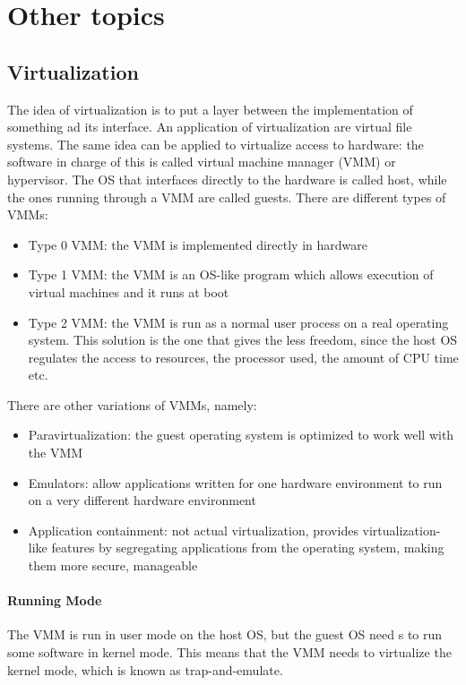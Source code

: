 \chapter{Other topics}
\section{Virtualization}
The idea of virtualization is to put a layer between the implementation of something ad its interface. An application of virtualization are virtual file systems. The same idea can be applied to virtualize access to hardware: the software in charge of this is called virtual machine manager (VMM) or hypervisor. The OS that interfaces directly to the hardware is called host, while the ones running through a VMM are called guests. There are different types of VMMs:
\begin{itemize}
    \item Type 0 VMM: the VMM is implemented directly in hardware
    \item Type 1 VMM: the VMM is an OS-like program which allows execution of virtual machines and it runs at boot
    \item Type 2 VMM: the VMM is run as a normal user process on a real operating system. This solution is the one that gives the less freedom, since the host OS regulates the access to resources, the processor used, the amount of CPU time etc.
\end{itemize}

There are other variations of VMMs, namely:
\begin{itemize}
    \item Paravirtualization: the guest operating system is optimized to work well with the VMM
    \item Emulators: allow applications written for one hardware
    environment to run on a very different hardware environment
    \item Application containment: not actual virtualization, provides virtualization-like features by segregating applications from the operating system, making them more secure,
    manageable
\end{itemize}

\subsubsection{Running Mode}
The VMM is run in user mode on the host OS, but the guest OS need s to run some software in kernel mode. This means that the VMM needs to virtualize the kernel mode, which is known as trap-and-emulate.

